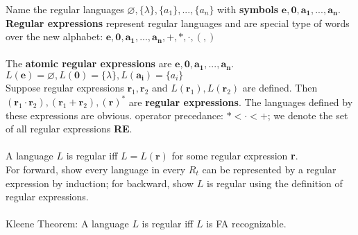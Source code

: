\documentclass{article}
\begin{document}
Name the regular languages \(\varnothing, \{\lambda\}, \{a_{1}\},...,\{a_{n}\}\) with \textbf{symbols} \(\mathbf{e},\mathbf{0},\mathbf{a_{1}},...,\mathbf{a_{n}}\). 
\textbf{Regular expressions} represent regular languages and are special type of words over the new alphabet: \(\mathbf{e},\mathbf{0},\mathbf{a_{1}},...,\mathbf{a_{n}},+,*,\cdot,(,)\)\\\\
The \textbf{atomic regular expressions} are \(\mathbf{e},\mathbf{0},\mathbf{a_{1}},...,\mathbf{a_{n}}\). \(L(\textbf{e})=\varnothing,L(\textbf{0})=\{\lambda\},L(\mathbf{a_{i}})=\{a_{i}\}\)\\
Suppose regular expressions \(\textbf{r}_{1},\textbf{r}_2\) and \(L(\textbf{r}_{1}),L(\textbf{r}_{2})\) are defined. Then \((\textbf{r}_{1}\cdot \textbf{r}_{2}),(\textbf{r}_{1}+\textbf{r}_{2}),(\textbf{r})^{*}\) are \textbf{regular expressions}. 
The languages defined by these expressions are obvious. operator precedance: \(*<\cdot<+\); we denote the set of all regular expressions \textbf{RE}.\\\\
\color{red}A language \(L\) is regular iff \(L=L(\textbf{r})\) for some regular expression \textbf{r}.\color{black}\\
For forward, show every language in every \(R_{t}\) can be represented by a regular expression by induction; for backward, show \(L\) is regular using the definition of regular expressions.\\\\
\color{red}Kleene Theorem: A language \(L\) is regular iff \(L\) is FA recognizable.\\\color{black}
\end{document}
